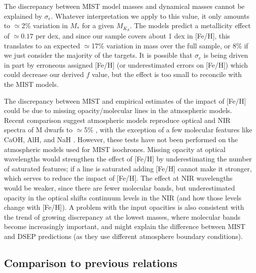 \documentclass[twocolumn]{aastex62}
\newcommand{\mks}{$M_{K_S}$}
\begin{document}
The discrepancy between MIST model masses and dynamical masses cannot be explained by $\sigma_e$. Whatever interpretation we apply to this value, it only amounts to $\simeq$2\% variation in $M_*$ for a given \mks. The models predict a metallicity effect of $\simeq0.17$ per dex, and since our sample covers about 1 dex in [Fe/H], this translates to an expected $\simeq$17\% variation in mass over the full sample, or 8\% if we just consider the majority of the targets. It is possible that $\sigma_e$ is being driven in part by erroneous assigned [Fe/H] (or underestimated errors on [Fe/H]) which could decrease our derived $f$ value, but the effect is too small to reconcile with the MIST models. 

 The discrepancy between MIST and empirical estimates of the impact of [Fe/H] could be due to missing opacity/molecular lines in the atmospheric models. Recent comparison suggest atmospheric models reproduce optical and NIR spectra of M dwarfs to $\simeq$5\% \citep[e.g.,][]{Lepine:2013,Mann2013c}, with the exception of a few molecular features like CaOH, AlH, and NaH \citep{Rajpurohit:2013}. However, these tests have not been performed on the atmospheric models used for MIST isochrones. Missing opacity at optical wavelengths would strengthen the effect of [Fe/H] by underestimating the number of saturated features; if a line is saturated adding [Fe/H] cannot make it stronger, which serves to reduce the impact of [Fe/H]. The effect at NIR wavelengths would be weaker, since there are fewer molecular bands, but underestimated opacity in the optical shifts continuum levels in the NIR (and how those levels change with [Fe/H]). A problem with the input opacities is also consistent with the trend of growing discrepancy at the lowest masses, where molecular bands become increasingly important, and might explain the difference between MIST and DSEP predictions (as they use different atmosphere boundary conditions). 

\subsection{Comparison to previous relations}\label{sec:other}

\subsubsection{\citet{Delfosse2000}}
\end{document}
